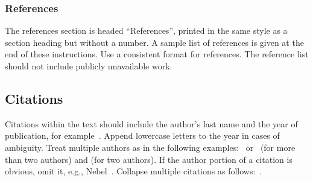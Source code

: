\documentclass{article}
\begin{document}
\subsubsection{References}

The references section is headed ``References'', printed in the same
style as a section heading but without a number. A sample list of
references is given at the end of these instructions. Use a consistent
format for references. The reference list should not include publicly unavailable work.

\subsection{Citations}

Citations within the text should include the author's last name and
the year of publication, for example~\cite{gottlob:nonmon}.  Append
lowercase letters to the year in cases of ambiguity.  Treat multiple
authors as in the following examples:~\cite{abelson-et-al:scheme}
or~\cite{bgf:Lixto} (for more than two authors) and
\cite{brachman-schmolze:kl-one} (for two authors).  If the author
portion of a citation is obvious, omit it, e.g.,
Nebel~.  Collapse multiple citations as
follows:~\cite{gls:hypertrees,levesque:functional-foundations}.
\nocite{abelson-et-al:scheme}
\nocite{bgf:Lixto}
\nocite{brachman-schmolze:kl-one}
\nocite{gottlob:nonmon}
\nocite{gls:hypertrees}
\nocite{levesque:functional-foundations}
\nocite{levesque:belief}
\nocite{nebel:jair-2000}






\end{document}
